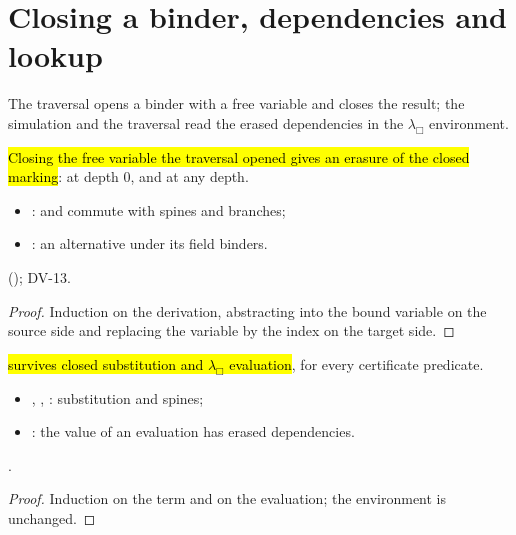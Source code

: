 \section{Closing a binder, dependencies and lookup}\label{sec:relation-abs}

The traversal opens a binder with a free variable and closes the result; the simulation and the traversal read the erased dependencies in the $\lambda_\Box$ environment.

\begin{lemma}
  \label{lem:EraseProof-Erases-abstract}
  \leanok
   \hl{Closing the free variable the traversal opened gives an erasure of the closed marking}:  at depth 0,  and  at any depth.
  \begin{itemize}
  \item {}:  and  commute with spines and branches;
  \item {}: an alternative under its field binders.
  \end{itemize}
    (); DV-13.
\end{lemma}
\begin{proof}
  \leanok
   Induction on the derivation, abstracting into the bound variable  on the source side and replacing the variable by the index  on the target side.
\end{proof}

\begin{lemma}
  \label{lem:EraseProof-ErasesDeps-csubst}
  \leanok
   \hl{ survives closed substitution and $\lambda_\Box$ evaluation}, for every certificate predicate.
  \begin{itemize}
  \item {}, , : substitution and spines;
  \item {}: the value of an evaluation has erased dependencies.
  \end{itemize}
   .
\end{lemma}
\begin{proof}
  \leanok
   Induction on the term and on the evaluation; the environment is unchanged.
\end{proof}

